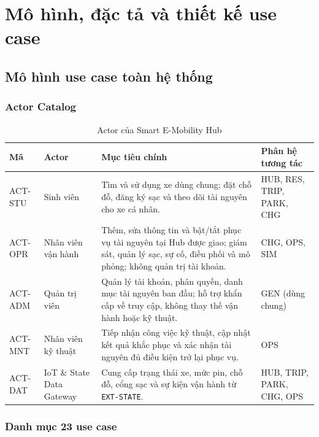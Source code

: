 \clearpage
\providecommand{\SystemDesignSectionTitle}{Mô hình, đặc tả và thiết kế use case}
\section{\SystemDesignSectionTitle}
\subsection{Mô hình use case toàn hệ thống}

\subsubsection{Actor Catalog}

\begin{table}[H]
  \centering
  \small
  \caption{Actor của Smart E-Mobility Hub}
  \label{tab:actors}
  \begin{tabularx}{\textwidth}{|L{22mm}|L{34mm}|Y|L{40mm}|}
    \hline
    \textbf{Mã} & \centering\arraybackslash\textbf{Actor} & \centering\arraybackslash\textbf{Mục tiêu chính} & \centering\arraybackslash\textbf{Phân hệ tương tác}\\
    \hline
    ACT-STU & Sinh viên & Tìm và sử dụng xe dùng chung; đặt chỗ đỗ, đăng ký sạc và theo dõi tài nguyên cho xe cá nhân. & HUB, RES, TRIP, PARK, CHG\\\hline
    ACT-OPR & Nhân viên vận hành & Thêm, sửa thông tin và bật/tắt phục vụ tài nguyên tại Hub được giao; giám sát, quản lý sạc, sự cố, điều phối và mô phỏng; không quản trị tài khoản. & CHG, OPS, SIM\\\hline
    ACT-ADM & Quản trị viên & Quản lý tài khoản, phân quyền, danh mục tài nguyên ban đầu; hỗ trợ khẩn cấp về truy cập, không thay thế vận hành hoặc kỹ thuật. & GEN (dùng chung)\\\hline
    ACT-MNT & Nhân viên kỹ thuật & Tiếp nhận công việc kỹ thuật, cập nhật kết quả khắc phục và xác nhận tài nguyên đủ điều kiện trở lại phục vụ. & OPS\\\hline
    ACT-DAT & IoT \& State Data Gateway & Cung cấp trạng thái xe, mức pin, chỗ đỗ, cổng sạc và sự kiện vận hành từ \texttt{EXT-STATE}. & HUB, TRIP, PARK, CHG, OPS\\\hline
  \end{tabularx}
\end{table}

\subsubsection{Danh mục 23 use case}

